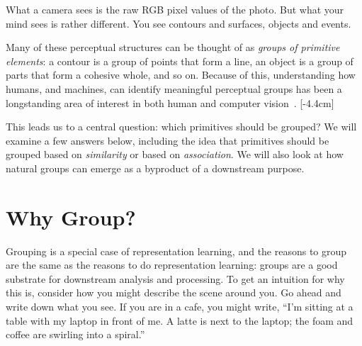 What a camera sees is the raw RGB pixel values of the photo. But what your mind sees is rather different. You see contours and surfaces, objects and events. 

Many of these perceptual structures can be thought of as \textit{groups of primitive elements}: a contour is a group of points that form a line, an object is a group of parts that form a cohesive whole, and so on. Because of this, understanding how humans, and machines, can identify meaningful perceptual groups has been a longstanding area of interest in both human and computer vision~\cite{Palmer1999}. %
[-4.4cm]

This leads us to a central question: which primitives should be grouped? We will examine a few answers below, including the idea that primitives should be grouped based on \textit{similarity} or based on \textit{association}. We will also look at how natural groups can emerge as a byproduct of a downstream purpose.

\section{Why Group?}
Grouping is a special case of representation learning, and the reasons to group are the same as the reasons to do representation learning: groups are a good substrate for downstream analysis and processing. To get an intuition for why this is, consider how you might describe the scene around you. Go ahead and write down what you see. If you are in a cafe, you might write, ``I'm sitting at a table with my laptop in front of me. A latte is next to the laptop; the foam and coffee are swirling into a spiral.''

